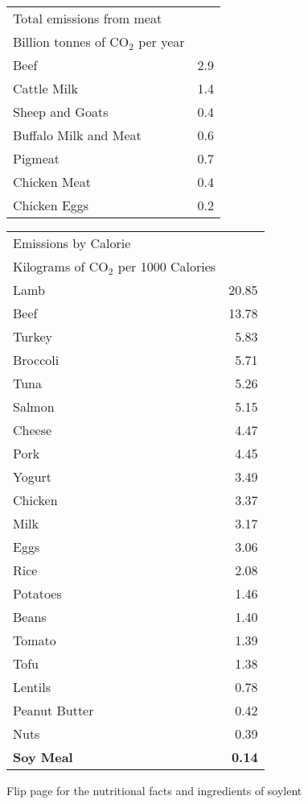 \documentclass[12pt]{article}
\makeatletter
\newcommand*\ColText[1]{\textcolor{Goldenrod3}{#1}}
\newenvironment{Group}[2]
  {\noindent\begin{tabular*}{\textwidth}{@{}p{.8\linewidth}@{\extracolsep{\fill}}r@{}}
    {\fontsize{24}{29}\selectfont\ColText{#1}}\\[0.4em]
    {\fontsize{16}{21}\selectfont\ColText{#2}}\\[0.8em]
  }
  {\end{tabular*}}
\newcommand*\Entry[2]{%
  \sffamily#1 & #2}
\makeatother
\begin{document}
\begin{Group}{Total emissions from meat}{Billion tonnes of CO$_2$ per year}
  \Entry{Beef}{2.9} \\
  \Entry{Cattle Milk}{1.4} \\
  \Entry{Sheep and Goats}{0.4} \\
  \Entry{Buffalo Milk and Meat}{0.6} \\
  \Entry{Pigmeat}{0.7} \\
  \Entry{Chicken Meat}{0.4} \\
  \Entry{Chicken Eggs}{0.2} \\
\end{Group}

\vfill

\begin{Group}{Emissions by Calorie}{Kilograms of CO$_2$ per 1000 Calories}
  \Entry{Lamb}{20.85} \\
  \Entry{Beef}{13.78} \\
  \Entry{Turkey}{5.83} \\
  \Entry{Broccoli}{5.71} \\
  \Entry{Tuna}{5.26} \\
  \Entry{Salmon}{5.15} \\
  \Entry{Cheese}{4.47} \\
  \Entry{Pork}{4.45} \\
  \Entry{Yogurt}{3.49} \\
  \Entry{Chicken}{3.37} \\
  \Entry{Milk}{3.17} \\
  \Entry{Eggs}{3.06} \\
  \Entry{Rice}{2.08} \\
  \Entry{Potatoes}{1.46} \\
  \Entry{Beans}{1.40} \\
  \Entry{Tomato}{1.39} \\
  \Entry{Tofu}{1.38} \\
  \Entry{Lentils}{0.78} \\
  \Entry{Peanut Butter}{0.42} \\
  \Entry{Nuts}{0.39} \\
  \Entry{\textbf{Soy Meal}}{\textbf{0.14}} \\
\end{Group}

\vfill

Flip page for the nutritional facts and ingredients of soylent
\end{document}
